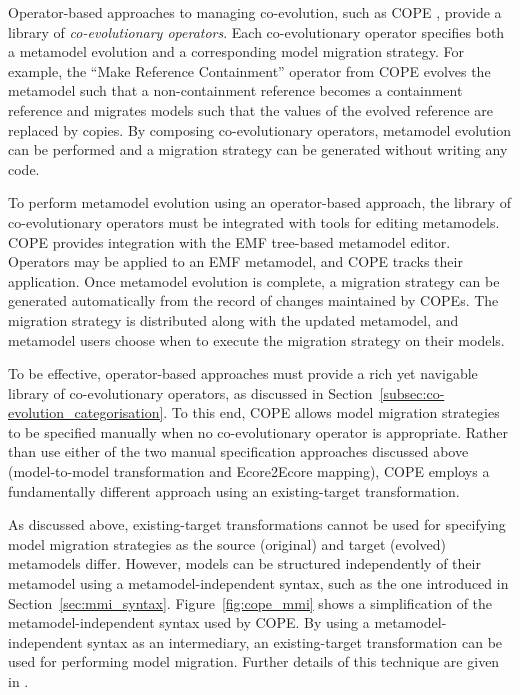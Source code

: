 Operator-based approaches to managing co-evolution, such as COPE \cite{herrmannsdoerfer09cope}, provide a library of \emph{co-evolutionary operators}. Each co-evolutionary operator specifies both a metamodel evolution and a corresponding model migration strategy. For example, the ``Make Reference Containment'' operator from COPE \cite{herrmannsdoerfer09cope} evolves the metamodel such that a non-containment reference becomes a containment reference and migrates models such that the values of the evolved reference are replaced by copies. By composing co-evolutionary operators, metamodel evolution can be performed and a migration strategy can be generated without writing any code.

To perform metamodel evolution using an operator-based approach, the library of co-evolutionary operators must be integrated with tools for editing metamodels. COPE provides integration with the EMF tree-based metamodel editor. Operators may be applied to an EMF metamodel, and COPE tracks their application. Once metamodel evolution is complete, a migration strategy can be generated automatically from the record of changes maintained by COPEs. The migration strategy is distributed along with the updated metamodel, and metamodel users choose when to execute the migration strategy on their models.

To be effective, operator-based approaches must provide a rich yet navigable library of co-evolutionary operators, as discussed in Section~\ref{subsec:co-evolution_categorisation}. To this end, COPE allows model migration strategies to be specified manually when no co-evolutionary operator is appropriate. Rather than use either of the two manual specification approaches discussed above (model-to-model transformation and Ecore2Ecore mapping), COPE employs a fundamentally different approach using an existing-target transformation.

As discussed above, existing-target transformations cannot be used for specifying model migration strategies as the source (original) and target (evolved) metamodels differ. However, models can be structured independently of their metamodel using a metamodel-independent syntax, such as the one introduced in Section~\ref{sec:mmi_syntax}. Figure~\ref{fig:cope_mmi} shows a simplification of the metamodel-independent syntax used by COPE. By using a metamodel-independent syntax as an intermediary, an existing-target transformation can be used for performing model migration. Further details of this technique are given in \cite{herrmannsdoerfer09cope}.

